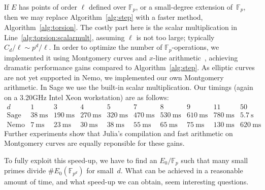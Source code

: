 \documentclass[12pt]{article}
\newcommand{\F}{\mathbb{F}}
\newcommand{\FF}{\F}
\newcommand{\ms}{\mathrm{\ ms}}
\newcommand{\s}{\mathrm{\ s}}
\begin{document}
If $E$ has points of order $\ell$
defined over \(\FF_p\), or a small-degree extension of~\(\FF_p\),
then we may replace Algorithm~\ref{alg:step}
with a faster method, Algorithm~\ref{alg:torsion}.
The costly part here is the scalar multiplication in
Line~\ref{alg:torsion:scalarmult}, assuming $\ell$ is not too large;
typically \(C_d/\ell\sim p^d/\ell\).
In order to optimize the number of $\F_p$-operations, we implemented it
using Montgomery curves and \(x\)-line arithmetic~\cite{Montgomery}, 
achieving dramatic performance gains compared to
Algorithm~\ref{alg:step}.
As elliptic curves are not yet supported in Nemo, we implemented our own Montgomery arithmetic. In Sage we use the built-in scalar multiplication. 
Our timings (again on a 3.20GHz Intel Xeon workstation) are as follows:
\[
    \begin{array}{c|c|c|c|c|c|c|c|c|c}
        d & 1 & 3 & 4 & 5 & 7 & 8 & 9 & 11 & 50\\
        \hline
        \text{Sage} & 38 \ms & 190 \ms & 270 \ms & 320 \ms & 470 \ms & 530 \ms & 610 \ms & 780 \ms & 5.7 \s\\
        \hline
        \text{Nemo} & 7 \ms & 23 \ms & 30 \ms & 38 \ms & 55 \ms & 65 \ms & 75 \ms & 130 \ms & 620\ms
    \end{array}
\]
Further experiments show that Julia's compilation and fast arithmetic on Montgomery curves are equally reponsible for these gains.

To fully exploit this speed-up, we have to find an \(E_0/\F_p\)
such that many small primes divide \(\#E_0(\FF_{p^d})\) for small~\(d\). 
What can be achieved in a reasonable amount of time, and what speed-up we can obtain, seem interesting questions. 
\end{document}
